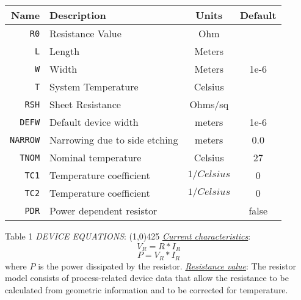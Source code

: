 \documentclass{article}
\begin{document}
\begin{tabular}{|r|l|c|c|}
\hline
\textbf{Name} & \textbf{Description} & \textbf{Units} & \textbf{Default} \\
\hline
\texttt{R0} & Resistance Value  & Ohm  &  \\
\hline
\texttt{L} & Length & Meters &  \\
\hline
\texttt{W} & Width & Meters & 1e-6 \\
\hline
\texttt{T} & System Temperature & Celsius &  \\
\hline
\texttt{RSH} & Sheet Resistance & Ohms/sq &  \\
\hline
\texttt{DEFW} & Default device width & meters & 1e-6 \\
\hline
\texttt{NARROW} & Narrowing due to side etching  & meters & 0.0 \\
\hline
\texttt{TNOM} & Nominal temperature & Celsius & 27 \\
\hline
\texttt{TC1}  & Temperature coefficient & $1/Celsius$ & 0 \\
\hline
\texttt{TC2} & Temperature coefficient  & $1/Celsius$ & 0 \\
\hline
\texttt{PDR} & Power dependent resistor & & false \\
\hline
\end{tabular}
\hspace{1.5in} Table 1
\newline
\textit{DEVICE EQUATIONS}:
\newline
\line(1,0){425}
\newline
\underline{\textit{Current characteristics}}:
\newline
\begin{equation}
V_R = R * I_R
\end{equation}
\begin{equation}
P = V_R * I_R
\end{equation}
where $P$ is the power dissipated by the resistor.
\newline
\underline{\textit{Resistance value}}:
\newline
The resistor model consists of process-related device data that
allow the resistance to be calculated from geometric information
and to be corrected for temperature.
\end{document}
